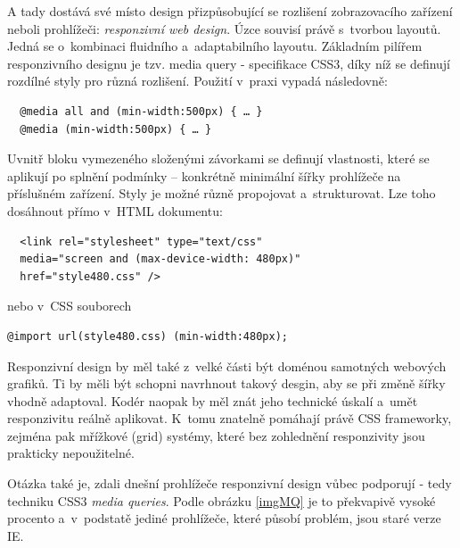 \documentclass[thesis=B,czech]{FITthesis}[2012/06/26]
\begin{document}
A tady dostává své místo design přizpůsobující se rozlišení zobrazovacího zařízení neboli prohlížeči: \textit{responzivní web design}. Úzce souvisí právě s~tvorbou layoutů. Jedná se o~kombinaci fluidního a~adaptabilního layoutu. Základním pilířem responzivního designu je tzv. media query - specifikace CSS3, díky níž se definují rozdílné styly pro různá rozlišení. Použití v~praxi vypadá následovně:
\scriptsize
\begin{verbatim}
  @media all and (min-width:500px) { … }
  @media (min-width:500px) { … }
\end{verbatim}
\normalsize
Uvnitř bloku vymezeného složenými závorkami se definují vlastnosti, které se aplikují po splnění podmínky -- konkrétně minimální šířky prohlížeče na příslušném zařízení. Styly je možné různě propojovat a~strukturovat. Lze toho dosáhnout přímo v~\gls{HTML} dokumentu:
\scriptsize
\begin{verbatim}
  <link rel="stylesheet" type="text/css"
  media="screen and (max-device-width: 480px)"
  href="style480.css" />
\end{verbatim}
\normalsize
nebo v~\gls{CSS} souborech\cite{mq}
\scriptsize
\begin{verbatim}
@import url(style480.css) (min-width:480px);
\end{verbatim}
\normalsize


Responzivní design by měl také z~velké části být doménou samotných webových grafiků. Ti by měli být schopni navrhnout takový desgin, aby se při změně šířky vhodně adaptoval. Kodér naopak by měl znát jeho technické úskalí a~umět responzivitu reálně aplikovat. K~tomu znatelně pomáhají právě \gls{CSS} frameworky, zejména pak mřížkové (grid) systémy, které bez zohlednění responzivity jsou prakticky nepoužitelné\cite{dev}\cite{dev2}.

Otázka také je, zdali dnešní prohlížeče responzivní design vůbec podporují - tedy techniku CSS3 \textit{media queries}. Podle obrázku \ref{imgMQ} je to překvapivě vysoké procento a~v~podstatě jediné prohlížeče, které působí problém, jsou staré verze \gls{IE}\cite{mqsup}. 
\end{document}
